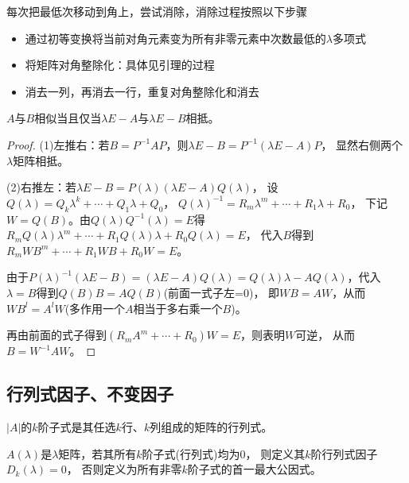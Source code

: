 \begin{theorem}
  每次把最低次移动到角上，尝试消除，消除过程按照以下步骤
  \begin{itemize}
  \item 通过初等变换将当前对角元素变为所有非零元素中次数最低的$\lambda$多项式
  \item 将矩阵对角整除化：具体见引理的过程
  \item 消去一列，再消去一行，重复对角整除化和消去
  \end{itemize}
\end{theorem}

\begin{theorem}[相抵与相似]
$A$与$B$相似当且仅当$\lambda E - A$与$\lambda E - B$相抵。
\end{theorem}

\begin{proof}
  (1)左推右：若$B = P^{-1}AP$，则$\lambda E - B = P^{-1}(\lambda E - A)P$，
  显然右侧两个$\lambda$矩阵相抵。

  (2)右推左：若$\lambda E - B = P(\lambda)(\lambda E - A)Q(\lambda)$，
  设$Q(\lambda) = Q_k\lambda^k + \cdots + Q_1\lambda + Q_0$，
  $Q(\lambda)^{-1} = R_m\lambda^m + \cdots + R_1\lambda + R_0$，
  下记$W = Q(B)$。由$Q(\lambda) Q^{-1}(\lambda) = E$得
  $R_mQ(\lambda)\lambda^m + \cdots + R_1Q(\lambda)\lambda + R_0Q(\lambda) = E$，
  代入$B$得到$R_mWB^m + \cdots + R_1WB + R_0W = E$。

  由于$P(\lambda)^{-1}(\lambda E - B) = (\lambda E - A)Q(\lambda) = Q(\lambda)\lambda - A Q(\lambda)$，代入$\lambda = B$得到$Q(B)B = AQ(B)$(前面一式子左=$0$)，
  即$WB = AW$，从而$WB^l = A^lW$(多作用一个$A$相当于多右乘一个$B$)。

  再由前面的式子得到$(R_mA^m + \cdots + R_0)W = E$，则表明$W$可逆，
  从而$B = W^{-1}AW$。
\end{proof}

\subsection{行列式因子、不变因子}

\begin{definition}
  $|A|$的$k$阶子式是其任选$k$行、$k$列组成的矩阵的行列式。
\end{definition}

\begin{definition}[行列式因子]
  $A(\lambda)$是$\lambda$矩阵，若其所有$k$阶子式(行列式)均为$0$，
  则定义其$k$阶行列式因子$D_k(\lambda) = 0$，
  否则定义为所有非零$k$阶子式的首一最大公因式。
\end{definition}

